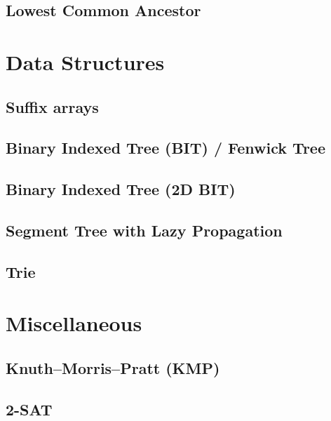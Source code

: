 \documentclass[12pt]{extarticle}
\begin{document}
\begin{multicols*}{3}
\subsection{Lowest Common Ancestor} 



\section{Data Structures}

\subsection{Suffix arrays} %


\subsection{Binary Indexed Tree (BIT) / Fenwick Tree} %


\subsection{Binary Indexed Tree (2D BIT)} %


\subsection{Segment Tree with Lazy Propagation} %


\subsection{Trie} %


\section{Miscellaneous}

\subsection{Knuth--Morris--Pratt (KMP)} %


\subsection{2-SAT} %



\end{multicols*}
\end{document}
